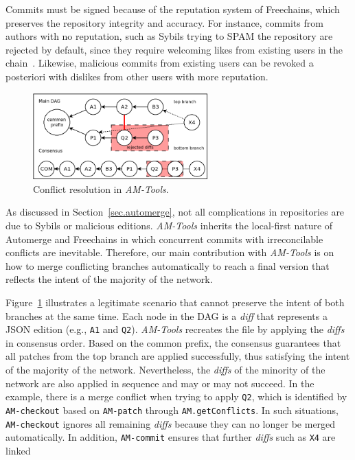 \documentclass[12pt]{article}
\newcommand{\AMT}      {\emph{AM-Tools}\xspace}
\newcommand{\code}[1]  {\texttt{\footnotesize{#1}}}
\newcommand{\ampatch}    {\code{AM-patch}\xspace}
\newcommand{\amcheckout} {\code{AM-checkout}\xspace}
\newcommand{\amcommit}   {\code{AM-commit}\xspace}
\begin{document}
Commits must be signed because of the reputation system of Freechains, which
preserves the repository integrity and accuracy.
For instance, commits from authors with no reputation, such as Sybils trying to
SPAM the repository are rejected by default, since they require welcoming likes
from existing users in the chain~\cite{fcs.sbseg20}.
Likewise, malicious commits from existing users can be revoked a posteriori
with dislikes from other users with more reputation.

\begin{figure}
    \includegraphics[width=0.6\textwidth]{conflicts.png}
    \caption{Conflict resolution in \AMT.}
    \label{fig.conflicts}
\end{figure}

As discussed in Section~\ref{sec.automerge}, not all complications in
repositories are due to Sybils or malicious editions.
\AMT inherits the local-first nature of Automerge and Freechains in which
concurrent commits with irreconcilable conflicts are inevitable.
%
Therefore, our main contribution with \AMT is on how to merge conflicting
branches automatically to reach a final version that reflects the intent of the
majority of the network.

Figure~\ref{fig.conflicts} illustrates a legitimate scenario that cannot
preserve the intent of both branches at the same time.
Each node in the DAG is a \emph{diff} that represents a JSON edition (e.g.,
\code{A1} and \code{Q2}).
\AMT recreates the file by applying the \emph{diffs} in consensus order.
Based on the common prefix, the consensus guarantees that all patches from the
top branch are applied successfully, thus satisfying the intent of the majority
of the network.
Nevertheless, the \emph{diffs} of the minority of the network are also applied
in sequence and may or may not succeed.
In the example, there is a merge conflict when trying to apply \code{Q2}, which
is identified by \amcheckout based on \ampatch through \code{AM.getConflicts}.
%
In such situations, \amcheckout ignores all remaining \emph{diffs} because they
can no longer be merged automatically.
In addition, \amcommit ensures that further \emph{diffs} such as \code{X4} are
linked 
\end{document}
